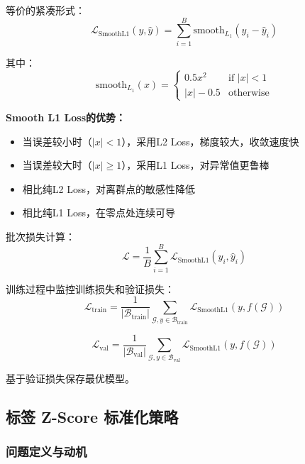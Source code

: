 等价的紧凑形式：
\begin{equation}
\mathcal{L}_{\text{SmoothL1}}(y, \hat{y}) = \sum_{i=1}^{B} \text{smooth}_{L_1}(y_i - \hat{y}_i)
\end{equation}

其中：
\begin{equation}
\text{smooth}_{L_1}(x) = \begin{cases}
0.5 x^2 & \text{if } |x| < 1 \\
|x| - 0.5 & \text{otherwise}
\end{cases}
\end{equation}

\textbf{Smooth L1 Loss的优势：}
\begin{itemize}
    \item 当误差较小时（$|x| < 1$），采用L2 Loss，梯度较大，收敛速度快
    \item 当误差较大时（$|x| \geq 1$），采用L1 Loss，对异常值更鲁棒
    \item 相比纯L2 Loss，对离群点的敏感性降低
    \item 相比纯L1 Loss，在零点处连续可导
\end{itemize}

批次损失计算：
\begin{equation}
\mathcal{L} = \frac{1}{B} \sum_{i=1}^{B} \mathcal{L}_{\text{SmoothL1}}(y_i, \hat{y}_i)
\end{equation}

训练过程中监控训练损失和验证损失：
\begin{equation}
\mathcal{L}_{\text{train}} = \frac{1}{|\mathcal{B}_{\text{train}}|} \sum_{\mathcal{G}, y \in \mathcal{B}_{\text{train}}} \mathcal{L}_{\text{SmoothL1}}(y, f(\mathcal{G}))
\end{equation}

\begin{equation}
\mathcal{L}_{\text{val}} = \frac{1}{|\mathcal{B}_{\text{val}}|} \sum_{\mathcal{G}, y \in \mathcal{B}_{\text{val}}} \mathcal{L}_{\text{SmoothL1}}(y, f(\mathcal{G}))
\end{equation}

基于验证损失保存最优模型。

\subsection{标签 Z-Score 标准化策略}

\subsubsection{问题定义与动机}

